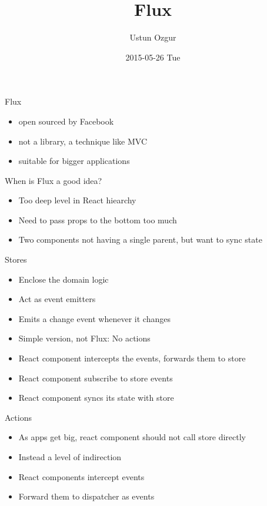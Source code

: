 \documentclass[presentation]{beamer}
\author{Ustun Ozgur}
\date{2015-05-26 Tue}
\title{Flux}
\begin{document}
\maketitle


\begin{frame}[label=sec-1]{Flux}
\begin{itemize}
\item open sourced by Facebook
\item not a library, a technique like MVC
\item suitable for bigger applications
\end{itemize}
\end{frame}

\begin{frame}[label=sec-2]{When is Flux a good idea?}
\begin{itemize}
\item Too deep level in React hiearchy
\item Need to pass props to the bottom too much
\item Two components not having a single parent, but want to sync state
\end{itemize}
\end{frame}


\begin{frame}[label=sec-3]{Stores}
\begin{itemize}
\item Enclose the domain logic
\item Act as event emitters
\item Emits a change event whenever it changes
\item Simple version, not Flux: No actions
\item React component intercepts the events, forwards them to store
\item React component subscribe to store events
\item React component syncs its state with store
\end{itemize}
\end{frame}

\begin{frame}[label=sec-4]{Actions}
\begin{itemize}
\item As apps get big, react component should not call store directly
\item Instead a level of indirection
\item React components intercept events
\item Forward them to dispatcher as events
\end{itemize}
\end{frame}
\end{document}
